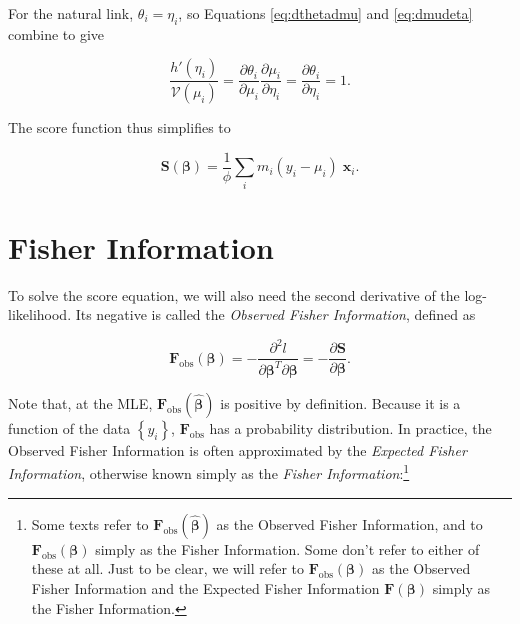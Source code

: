 \documentclass[
  12pt,
]{book}
\begin{document}
For the natural link, \(\theta_{i} = \eta_{i}\), so Equations \eqref{eq:dthetadmu} and \eqref{eq:dmudeta} combine to give

\begin{equation}
  \frac{h'(\eta_i)}{\mathcal{V}(\mu_i)} 
  = \frac{\partial\theta_{i}}{\partial \mu_{i}} \frac{\partial\mu_{i}}{\partial \eta_{i}} 
  = \frac{\partial\theta_{i}}{\partial \eta_{i}} 
  = 1.
\end{equation}

The score function thus simplifies to

\begin{equation}
  \boldsymbol{S}(\boldsymbol{\beta}) = \frac{1}{\phi}\sum_{i} m_{i}(y_{i} - \mu_{i})\;\boldsymbol{x}_{i}.
  \label{eq:scorefunctionnaturallink}
\end{equation}

\section{Fisher Information}\label{fisherinformation}

To solve the score equation, we will also need the second derivative of the log-likelihood. Its negative is called the \emph{Observed Fisher Information}, defined as

\begin{equation}
  \boldsymbol{F}_{\text{obs}}(\boldsymbol{\beta})
  = - \frac{\partial^{2} l}{\partial\boldsymbol{\beta}^{T}\partial\boldsymbol{\beta}}
  = - \frac{\partial \boldsymbol{S}}{\partial \boldsymbol{\beta}}.
  \label{eq:observedfisherinformation}
\end{equation}

Note that, at the MLE, \(\boldsymbol{F}_{\text{obs}}(\hat{\boldsymbol{\beta}})\) is positive by definition.
Because it is a function of the data \(\left\{y_{i}\right\}\), \(\boldsymbol{F}_{\text{obs}}\) has a probability distribution. In practice, the Observed Fisher Information is often approximated by the \emph{Expected Fisher Information}, otherwise known simply as the \emph{Fisher Information}:\footnote{Some texts refer to \(\boldsymbol{F}_{\text{obs}}(\hat{\boldsymbol{\beta}})\) as the Observed Fisher Information, and to \(\boldsymbol{F}_{\text{obs}}(\boldsymbol{\beta})\) simply as the Fisher Information. Some don't refer to either of these at all. Just to be clear, we will refer to \(\boldsymbol{F}_{\text{obs}}(\boldsymbol{\beta})\) as the Observed Fisher Information and the Expected Fisher Information \(\boldsymbol{F}(\boldsymbol{\beta})\) simply as the Fisher Information.}
\end{document}
